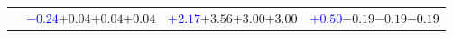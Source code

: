 \documentclass[compress]{beamer}
\begin{document}
\begin{frame}
\begin{tabular}{r | c | c | c}
          & \textcolor{blue}{$-0.24$}\hspace{0.1 cm}$+0.04$\hspace{0.1 cm}$+0.04$\hspace{0.1 cm}\textcolor{black}{$+0.04$} & \textcolor{blue}{$+2.17$}\hspace{0.1 cm}$+3.56$\hspace{0.1 cm}$+3.00$\hspace{0.1 cm}\textcolor{black}{$+3.00$} & \textcolor{blue}{$+0.50$}\hspace{0.1 cm}$-0.19$\hspace{0.1 cm}$-0.19$\hspace{0.1 cm}\textcolor{black}{$-0.19$} \\
\end{tabular}
\end{frame}
\end{document}
